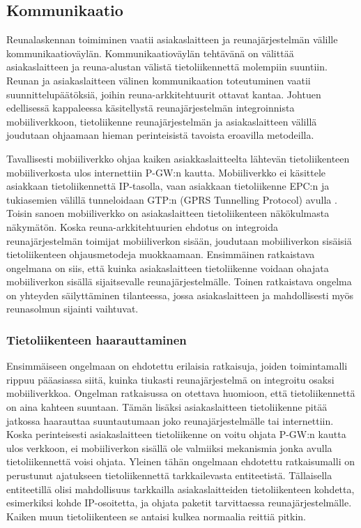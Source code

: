 \subsection{Kommunikaatio}
Reunalaskennan toimiminen vaatii asiakaslaitteen ja reunajärjestelmän välille kommunikaatioväylän.
Kommunikaatioväylän tehtävänä on välittää asiakaslaitteen ja reuna-alustan välistä tietoliikennettä molempiin suuntiin.
Reunan ja asiakaslaitteen välinen kommunikaation toteutuminen vaatii suunnittelupäätöksiä, joihin reuna-arkkitehtuurit ottavat kantaa. 
Johtuen edellisessä kappaleessa käsitellystä reunajärjestelmän integroinnista mobiiliverkkoon, tietoliikenne reunajärjestelmän ja asiakaslaitteen välillä joudutaan ohjaamaan hieman perinteisistä tavoista eroavilla metodeilla. 

Tavallisesti mobiiliverkko ohjaa kaiken asiakkaslaitteelta lähtevän tietoliikenteen mobiiliverkosta ulos internettiin P-GW:n kautta. 
Mobiiliverkko ei käsittele asiakkaan tietoliikennettä IP-tasolla, vaan asiakkaan tietoliikenne EPC:n ja tukiasemien välillä tunneloidaan GTP:n (GPRS Tunnelling Protocol) avulla \cite{lobillo15scc}.
Toisin sanoen mobiiliverkko on asiakaslaitteen tietoliikenteen näkökulmasta näkymätön.
Koska reuna-arkkitehtuurien ehdotus on integroida reunajärjestelmän toimijat mobiiliverkon sisään, joudutaan mobiiliverkon sisäisiä tietoliikenteen ohjausmetodeja muokkaamaan.
Ensimmäinen ratkaistava ongelmana on siis, että kuinka asiakaslaitteen tietoliikenne voidaan ohajata mobiiliverkon sisällä sijaitsevalle reunajärjestelmälle.
Toinen ratkaistava ongelma on yhteyden säilyttäminen tilanteessa, jossa asiakaslaitteen ja mahdollisesti myös reunasolmun sijainti vaihtuvat.

\subsubsection*{Tietoliikenteen haarauttaminen}
Ensimmäiseen ongelmaan on ehdotettu erilaisia ratkaisuja, joiden toimintamalli rippuu pääasiassa siitä, kuinka tiukasti reunajärjestelmä on integroitu osaksi mobiiliverkkoa.
Ongelman ratkaisussa on otettava huomioon, että tietoliikennettä on aina kahteen suuntaan. Tämän lisäksi asiakaslaitteen tietoliikenne pitää jatkossa haarauttaa suuntautumaan joko reunajärjestelmälle tai internettiin. 
Koska perinteisesti asiakaslaitteen tietoliikenne on voitu ohjata P-GW:n kautta ulos verkkoon, ei mobiiliverkon sisällä ole valmiiksi mekanismia jonka avulla tietoliikennettä voisi ohjata.
Yleinen tähän ongelmaan ehdotettu ratkaisumalli on perustunut ajatukseen tietoliikennettä tarkkailevasta entiteetistä.
Tällaisella entiteetillä olisi mahdollisuus tarkkailla asiakaslaitteiden tietoliikenteen kohdetta, esimerkiksi kohde IP-osoitetta, ja ohjata paketit tarvittaessa reunajärjestelmälle.
Kaiken muun tietoliikenteen se antaisi kulkea normaalia reittiä pitkin.

